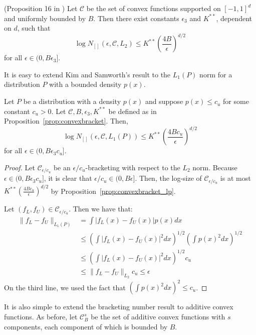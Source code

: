 \documentclass[12pt,pdftex,aos,noinfoline,addressasfootnote]{imsart}
\begin{document}
\begin{proposition} (Proposition 16 in \cite{kim2014global})
\label{prop:convexbracket}
Let $\mathcal{C}$ be the set of convex functions supported on $[-1, 1]^d$ and uniformly bounded by $B$. Then there exist constants $\epsilon_3$ and $K^{**}$, dependent on $d$, such that
\[
\log N_{[]} (\epsilon, \mathcal{C}, L_2) \leq K^{**} \left( \frac{4B}{\epsilon} \right)^{d/2}
\]
for all $\epsilon \in (0, B \epsilon_3]$.
\end{proposition}

It is easy to extend Kim and Samworth's result to the $L_1(P)$ norm for a distribution $P$ with a bounded density $p(x)$.

\begin{proposition}
\label{prop:convexbracket_lp}
Let $P$ be a distribution with a density $p(x)$ and suppose $p(x) \leq c_u$ for some constant $c_u >0$. Let $\mathcal{C}, B, \epsilon_3, K^{**}$ be defined as in Proposition~\ref{prop:convexbracket}. Then,
\[
\log N_{[]} (\epsilon, \mathcal{C}, L_1(P)) \leq K^{**} \left( \frac{4Bc_u}{\epsilon} \right)^{d/2}
\]
for all $\epsilon \in (0, B\epsilon_3 c_u]$.
\end{proposition}

\begin{proof}
Let $\mathcal{C}_{\epsilon/c_u}$ be an $\epsilon/c_u$-bracketing with respect to the $L_2$ norm. Because $\epsilon \in (0, B \epsilon_3 c_u]$, it is clear that $\epsilon/c_u \in (0, B\epsilon]$. Then, the log-size of $\mathcal{C}_{\epsilon/c_u}$ is at most $K^{**} \left( \frac{4Bc_u}{\epsilon} \right)^{d/2}$ by Proposition~\ref{prop:convexbracket_lp}. 

Let $(f_L, f_U) \in \mathcal{C}_{\epsilon/c_u}$. Then we have that:
\begin{align*}
\| f_L - f_U \|_{L_1(P)} &= \int | f_L(x) - f_U(x)| p(x) dx \\
   &\leq \left( \int | f_L(x) - f_U(x) |^2 dx \right)^{1/2}
      \left( \int p(x)^2 dx \right)^{1/2} \\
  &\leq \left( \int | f_L(x) - f_U(x)|^2 dx \right)^{1/2} c_u\\
 &\leq \| f_L - f_U \|_{L_2} c_u \leq \epsilon
\end{align*}
On the third line, we used the fact that $\left( \int p(x)^2 dx \right)^2 \leq c_u$.
\end{proof}

It is also simple to extend the bracketing number result to additive convex functions. As before, let $\mathcal{C}^s_B$ be the set of additive convex functions with $s$ components, each component of which is bounded by $B$.
\end{document}
